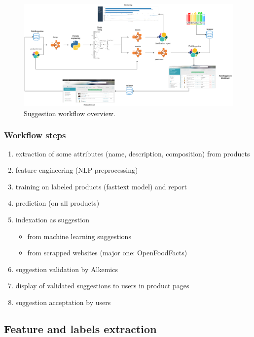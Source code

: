 \begin{figure}[H]
\centering
\includegraphics[scale=0.30]{./images/workflow/fieldsuggestion-workflow.png}
\caption{Suggestion workflow overview.}
\end{figure}

\subsubsection{Workflow steps}
\begin{enumerate}
	\item extraction of some attributes (name, description, composition) from products
	\item feature engineering (NLP preprocessing)
	\item training on labeled products (fasttext model) and report
	\item prediction (on all products)
	\item indexation as suggestion
	\begin{itemize}
		\item from machine learning suggestions
		\item from scrapped websites (major one: OpenFoodFacts)
	\end{itemize}
	\item suggestion validation by Alkemics
	\item display of validated suggestions to users in product pages
	\item suggestion acceptation by users
\end{enumerate}




\subsection{Feature and labels extraction}

